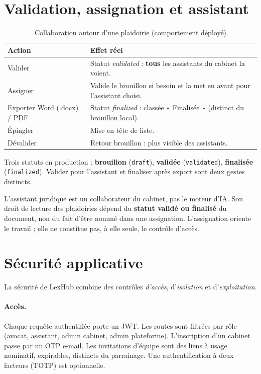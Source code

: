 \section{Validation, assignation et assistant}

\begin{table}[H]
\centering
\caption{Collaboration autour d'une plaidoirie (comportement déployé)}
\label{tab:collab}
\small
\begin{tabular}{@{}lp{9.8cm}@{}}
\toprule
\textbf{Action} & \textbf{Effet réel} \\
\midrule
Valider & Statut \textit{validated} : \textbf{tous} les assistants du cabinet la voient. \\
Assigner & Valide le brouillon si besoin et la met en avant pour l'assistant choisi. \\
Exporter Word (.docx) / PDF & Statut \textit{finalized} : classée « Finalisée » (distinct du brouillon local). \\
Épingler & Mise en tête de liste. \\
Dévalider & Retour brouillon : plus visible des assistants. \\
\bottomrule
\end{tabular}
\end{table}

Trois statuts en production : \textbf{brouillon} (\texttt{draft}), \textbf{validée} (\texttt{validated}), \textbf{finalisée} (\texttt{finalized}). Valider pour l'assistant et finaliser après export sont deux gestes distincts.

L'assistant juridique est un collaborateur du cabinet, pas le moteur d'IA. Son droit de lecture des plaidoiries dépend du \textbf{statut validé ou finalisé} du document, non du fait d'être nommé dans une assignation. L'assignation oriente le travail ; elle ne constitue pas, à elle seule, le contrôle d'accès.

\section{Sécurité applicative}
\label{sec:securite}

La sécurité de LexHub combine des contrôles \emph{d'accès}, d'\emph{isolation} et d'\emph{exploitation}.

\paragraph{Accès.}
Chaque requête authentifiée porte un JWT. Les routes sont filtrées par rôle (avocat, assistant, admin cabinet, admin plateforme). L'inscription d'un cabinet passe par un OTP e-mail. Les invitations d'équipe sont des liens à usage nominatif, expirables, distincts du parrainage. Une authentification à deux facteurs (TOTP) est optionnelle.

